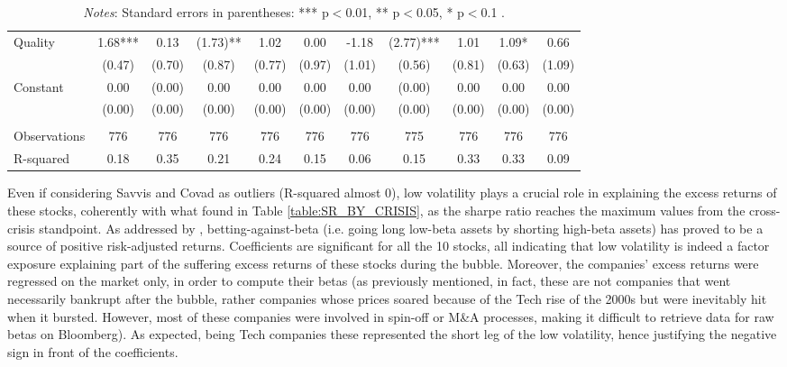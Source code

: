 \documentclass[12pt]{article}
\begin{document}
\begin{table}[H]
{\begin{tabular}{@{}lcccccccccc@{}}
Quality       & 1.68***   & 0.13               & (1.73)**        & 1.02      & 0.00      & -1.18     & (2.77)***      & 1.01      & 1.09*          & 0.66      \\
              & (0.47)    & (0.70)             & (0.87)          & (0.77)    & (0.97)    & (1.01)    & (0.56)         & (0.81)    & (0.63)         & (1.09)    \\
Constant      & 0.00      & (0.00)             & 0.00            & 0.00      & 0.00      & 0.00      & (0.00)         & 0.00      & 0.00           & 0.00      \\
              & (0.00)    & (0.00)             & (0.00)          & (0.00)    & (0.00)    & (0.00)    & (0.00)         & (0.00)    & (0.00)         & (0.00)    \\
              &           &                    &                 &           &           &           &                &           &                &           \\
Observations  & 776       & 776                & 776             & 776       & 776       & 776       & 775            & 776       & 776            & 776       \\
R-squared     & 0.18      & 0.35               & 0.21            & 0.24      & 0.15      & 0.06      & 0.15           & 0.33      & 0.33           & 0.09      \\ \bottomrule
\end{tabular}}
\smallskip
\caption*{\textit{Notes}: Standard errors in parentheses: *** p$<$0.01, ** p$<$0.05, * p$<$0.1 .}
\end{table}

Even if considering Savvis and Covad as outliers (R-squared almost 0), low volatility plays a crucial role in explaining the excess returns of these stocks, coherently with what found in Table \ref{table:SR_BY_CRISIS}, as the sharpe ratio reaches the maximum values from the cross-crisis standpoint. As addressed by , betting-against-beta (i.e. going long low-beta assets by shorting high-beta assets) has proved to be a source of positive risk-adjusted returns. Coefficients are significant for all the 10 stocks, all indicating that low volatility is indeed a factor exposure explaining part of the suffering excess returns of these stocks during the bubble. Moreover, the companies' excess returns were regressed on the market only, in order to compute their betas (as previously mentioned, in fact, these are not companies that went necessarily bankrupt after the bubble, rather companies whose prices soared because of the Tech rise of the 2000s but were inevitably hit when it bursted. However, most of these companies were involved in spin-off or M\&A processes, making it difficult to retrieve data for raw betas on Bloomberg). As expected, being Tech companies these represented the short leg of the low volatility, hence justifying the negative sign in front of the coefficients.
\end{document}
